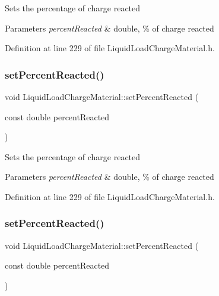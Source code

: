 Sets the percentage of charge reacted 
\begin{DoxyParams}{Parameters}
{\em percent\+Reacted} & double, \% of charge reacted \\
\hline
\end{DoxyParams}


Definition at line 229 of file Liquid\+Load\+Charge\+Material.\+h.

\mbox{\label{class_liquid_load_charge_material_a9984b8c78a460ef3569fc3ef13eea604}} 
\subsubsection{\texorpdfstring{set\+Percent\+Reacted()}{setPercentReacted()}\hspace{0.1cm}{\footnotesize\ttfamily [2/3]}}
{\footnotesize\ttfamily void Liquid\+Load\+Charge\+Material\+::set\+Percent\+Reacted (\begin{DoxyParamCaption}\item[{const double}]{percent\+Reacted }\end{DoxyParamCaption})\hspace{0.3cm}{\ttfamily [inline]}}

Sets the percentage of charge reacted 
\begin{DoxyParams}{Parameters}
{\em percent\+Reacted} & double, \% of charge reacted \\
\hline
\end{DoxyParams}


Definition at line 229 of file Liquid\+Load\+Charge\+Material.\+h.

\mbox{\label{class_liquid_load_charge_material_a9984b8c78a460ef3569fc3ef13eea604}} 
\subsubsection{\texorpdfstring{set\+Percent\+Reacted()}{setPercentReacted()}\hspace{0.1cm}{\footnotesize\ttfamily [3/3]}}
{\footnotesize\ttfamily void Liquid\+Load\+Charge\+Material\+::set\+Percent\+Reacted (\begin{DoxyParamCaption}\item[{const double}]{percent\+Reacted }\end{DoxyParamCaption})\hspace{0.3cm}{\ttfamily [inline]}}

